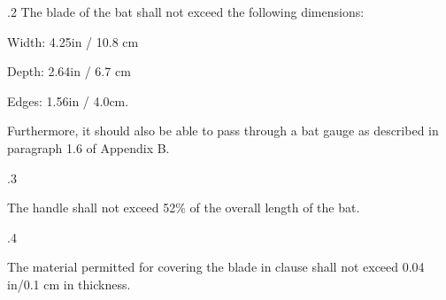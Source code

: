 \documentclass[12pt]{article}
\begin{document}
\vspace{\baselineskip}
{\fontsize{9pt}{10.8pt}.2 \tabto{0.49in} The blade of the bat shall not exceed the following dimensions:\par}\par


\vspace{\baselineskip}
\begin{adjustwidth}{0.5in}{0.0in}
{\fontsize{9pt}{10.8pt}\selectfont Width: 4.25in / 10.8 cm\par}\par

\end{adjustwidth}


\vspace{\baselineskip}
\begin{adjustwidth}{0.5in}{0.0in}
{\fontsize{9pt}{10.8pt}\selectfont Depth: 2.64in / 6.7 cm\par}\par

\end{adjustwidth}


\vspace{\baselineskip}
\begin{adjustwidth}{0.5in}{0.0in}
{\fontsize{9pt}{10.8pt}\selectfont Edges: 1.56in / 4.0cm.\par}\par

\end{adjustwidth}


\vspace{\baselineskip}
\begin{adjustwidth}{0.5in}{0.1in}
{\fontsize{9pt}{10.8pt}\selectfont Furthermore, it should also be able to pass through a bat gauge as described in paragraph 1.6 of Appendix B.\par}\par

\end{adjustwidth}


\vspace{\baselineskip}
{\fontsize{9pt}{10.8pt}.3 \tabto{0.49in} {\fontsize{8pt}{9.6pt}\selectfont The handle shall not exceed 52$\%$  of the overall length of the bat.\par}\par}\par


\vspace{\baselineskip}
{\fontsize{9pt}{10.8pt}.4 \tabto{0.49in} {\fontsize{8pt}{9.6pt}\selectfont The material permitted for covering the blade in clause shall not exceed 0.04 in/0.1 cm in thickness.\par}\par}\par
\end{document}
